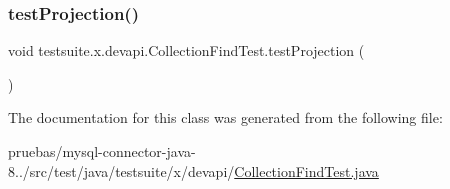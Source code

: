 \subsubsection{\texorpdfstring{test\+Projection()}{testProjection()}}
{\footnotesize\ttfamily void testsuite.\+x.\+devapi.\+Collection\+Find\+Test.\+test\+Projection (\begin{DoxyParamCaption}{ }\end{DoxyParamCaption})}



The documentation for this class was generated from the following file\+:\begin{DoxyCompactItemize}
\item 
pruebas/mysql-\/connector-\/java-\/8../src/test/java/testsuite/x/devapi/\mbox{\hyperlink{_collection_find_test_8java}{Collection\+Find\+Test.\+java}}\end{DoxyCompactItemize}
